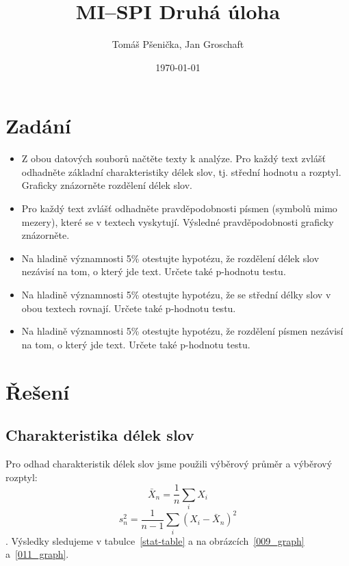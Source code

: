 \documentclass[12pt]{article}
\title{MI--SPI Druhá úloha}
\author{Tomáš Pšenička, Jan Groschaft}
\date{\today}
\begin{document}
 
\begin{titlingpage}
	\maketitle
\end{titlingpage}
 	
	\newpage
 
	\tableofcontents

	\newpage

 	\section{Zadání}
 	
 	\begin{itemize}
 		\item Z obou datových souborů načtěte texty k analýze. Pro každý text zvlášť odhadněte základní charakteristiky délek slov, tj. střední hodnotu a rozptyl. Graficky znázorněte rozdělení délek slov.
  		\item Pro každý text zvlášť odhadněte pravděpodobnosti písmen (symbolů mimo mezery), které se v textech vyskytují. Výsledné pravděpodobnosti graficky znázorněte.
 		\item Na hladině významnosti 5\% otestujte hypotézu, že rozdělení délek slov nezávisí na tom, o který jde text. Určete také p-hodnotu testu. 		
 		\item Na hladině významnosti 5\% otestujte hypotézu, že se střední délky slov v obou textech rovnají. Určete také p-hodnotu testu.
		\item Na hladině významnosti 5\% otestujte hypotézu, že rozdělení písmen nezávisí na tom, o který jde text. Určete také p-hodnotu testu.
 	\end{itemize}
   		
   		
	\section{Řešení}\label{r}
		\subsection{Charakteristika délek slov}\label{pz}
            Pro odhad charakteristik délek slov jsme použili výběrový průměr a výběrový rozptyl: 
               $$\bar{X}_n = \frac{1}{n} \sum_{i}{X_i}$$   					
               $$s_n^2 = \frac{1}{n-1} \sum_{i}{(X_i - \bar{X}_n)^2}$$.
            Výsledky sledujeme v tabulce~\ref{stat-table} a na obrázcích~\ref{009_graph} a~\ref{011_graph}. 
\end{document}
